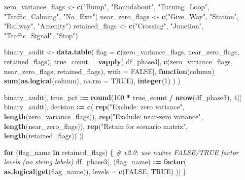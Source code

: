 \documentclass[
]{article}
\newenvironment{Shaded}{\begin{snugshade}}{\end{snugshade}}
\newcommand{\AttributeTok}[1]{\textcolor[rgb]{0.13,0.29,0.53}{#1}}
\newcommand{\CommentTok}[1]{\textcolor[rgb]{0.56,0.35,0.01}{\textit{#1}}}
\newcommand{\ConstantTok}[1]{\textcolor[rgb]{0.56,0.35,0.01}{#1}}
\newcommand{\ControlFlowTok}[1]{\textcolor[rgb]{0.13,0.29,0.53}{\textbf{#1}}}
\newcommand{\DecValTok}[1]{\textcolor[rgb]{0.00,0.00,0.81}{#1}}
\newcommand{\FunctionTok}[1]{\textcolor[rgb]{0.13,0.29,0.53}{\textbf{#1}}}
\newcommand{\NormalTok}[1]{#1}
\newcommand{\OtherTok}[1]{\textcolor[rgb]{0.56,0.35,0.01}{#1}}
\newcommand{\SpecialCharTok}[1]{\textcolor[rgb]{0.81,0.36,0.00}{\textbf{#1}}}
\newcommand{\StringTok}[1]{\textcolor[rgb]{0.31,0.60,0.02}{#1}}
\begin{document}
\begin{Shaded}
\begin{Highlighting}[]
\NormalTok{zero\_variance\_flags }\OtherTok{\textless{}{-}} \FunctionTok{c}\NormalTok{(}\StringTok{"Bump"}\NormalTok{, }\StringTok{"Roundabout"}\NormalTok{, }\StringTok{"Turning\_Loop"}\NormalTok{, }\StringTok{"Traffic\_Calming"}\NormalTok{, }\StringTok{"No\_Exit"}\NormalTok{)}
\NormalTok{near\_zero\_flags }\OtherTok{\textless{}{-}} \FunctionTok{c}\NormalTok{(}\StringTok{"Give\_Way"}\NormalTok{, }\StringTok{"Station"}\NormalTok{, }\StringTok{"Railway"}\NormalTok{, }\StringTok{"Amenity"}\NormalTok{)}
\NormalTok{retained\_flags }\OtherTok{\textless{}{-}} \FunctionTok{c}\NormalTok{(}\StringTok{"Crossing"}\NormalTok{, }\StringTok{"Junction"}\NormalTok{, }\StringTok{"Traffic\_Signal"}\NormalTok{, }\StringTok{"Stop"}\NormalTok{)}

\NormalTok{binary\_audit }\OtherTok{\textless{}{-}} \FunctionTok{data.table}\NormalTok{(}
  \AttributeTok{flag =} \FunctionTok{c}\NormalTok{(zero\_variance\_flags, near\_zero\_flags, retained\_flags),}
  \AttributeTok{true\_count =} \FunctionTok{vapply}\NormalTok{(}
\NormalTok{    df\_phase3[, }\FunctionTok{c}\NormalTok{(zero\_variance\_flags, near\_zero\_flags, retained\_flags), }\AttributeTok{with =} \ConstantTok{FALSE}\NormalTok{],}
    \ControlFlowTok{function}\NormalTok{(column) }\FunctionTok{sum}\NormalTok{(}\FunctionTok{as.logical}\NormalTok{(column), }\AttributeTok{na.rm =} \ConstantTok{TRUE}\NormalTok{),}
    \FunctionTok{integer}\NormalTok{(}\DecValTok{1}\NormalTok{)}
\NormalTok{  )}
\NormalTok{)}

\NormalTok{binary\_audit[, true\_pct }\SpecialCharTok{:=} \FunctionTok{round}\NormalTok{(}\DecValTok{100} \SpecialCharTok{*}\NormalTok{ true\_count }\SpecialCharTok{/} \FunctionTok{nrow}\NormalTok{(df\_phase3), }\DecValTok{4}\NormalTok{)]}
\NormalTok{binary\_audit[, decision }\SpecialCharTok{:=} \FunctionTok{c}\NormalTok{(}
  \FunctionTok{rep}\NormalTok{(}\StringTok{"Exclude: zero variance"}\NormalTok{, }\FunctionTok{length}\NormalTok{(zero\_variance\_flags)),}
  \FunctionTok{rep}\NormalTok{(}\StringTok{"Exclude: near{-}zero variance"}\NormalTok{, }\FunctionTok{length}\NormalTok{(near\_zero\_flags)),}
  \FunctionTok{rep}\NormalTok{(}\StringTok{"Retain for scenario matrix"}\NormalTok{, }\FunctionTok{length}\NormalTok{(retained\_flags))}
\NormalTok{)]}

\ControlFlowTok{for}\NormalTok{ (flag\_name }\ControlFlowTok{in}\NormalTok{ retained\_flags) \{}
  \CommentTok{\# v2.0: use native FALSE/TRUE factor levels (no string labels)}
\NormalTok{  df\_phase3[, (flag\_name) }\SpecialCharTok{:=} \FunctionTok{factor}\NormalTok{(}
    \FunctionTok{as.logical}\NormalTok{(}\FunctionTok{get}\NormalTok{(flag\_name)),}
    \AttributeTok{levels =} \FunctionTok{c}\NormalTok{(}\ConstantTok{FALSE}\NormalTok{, }\ConstantTok{TRUE}\NormalTok{)}
\NormalTok{  )]}
\NormalTok{\}}


\end{Highlighting}
\end{Shaded}
\end{document}
